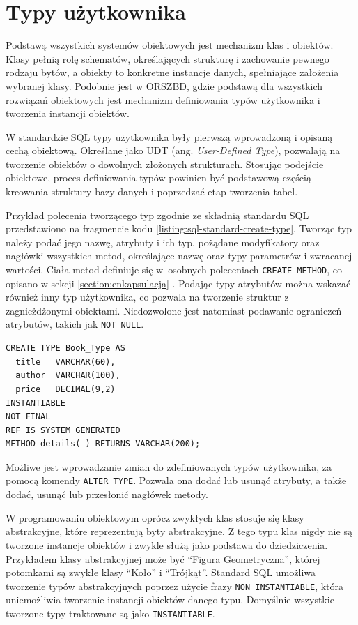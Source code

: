 \documentclass[a4paper,twoside,12pt]{book}
\begin{document}
\section{Typy użytkownika}

Podstawą wszystkich systemów obiektowych jest mechanizm klas i obiektów. Klasy pełnią rolę schematów, określających strukturę i zachowanie pewnego rodzaju bytów, a obiekty to konkretne instancje danych, spełniające założenia wybranej klasy. Podobnie jest w ORSZBD, gdzie podstawą dla wszystkich rozwiązań obiektowych jest mechanizm definiowania typów użytkownika i tworzenia instancji obiektów.

W standardzie SQL typy użytkownika były pierwszą wprowadzoną i opisaną cechą obiektową. Określane jako UDT (ang. \textit{User-Defined Type}), pozwalają na tworzenie obiektów o dowolnych złożonych strukturach. Stosując podejście obiektowe, proces definiowania typów powinien być podstawową częścią kreowania struktury bazy danych i poprzedzać etap tworzenia tabel.

Przykład polecenia tworzącego typ zgodnie ze składnią standardu SQL przedstawiono na fragmencie kodu \ref{listing:sql-standard-create-type}. Tworząc typ należy podać jego nazwę, atrybuty i ich typ, pożądane modyfikatory oraz nagłówki wszystkich metod, określające nazwę oraz typy parametrów i zwracanej wartości. Ciała metod definiuje się w~osobnych poleceniach \lstinline{CREATE METHOD}, co opisano w sekcji \ref{section:enkapsulacja} . Podając typy atrybutów można wskazać również inny typ użytkownika, co pozwala na tworzenie struktur z zagnieżdżonymi obiektami. Niedozwolone jest natomiast podawanie ograniczeń atrybutów, takich jak \lstinline{NOT NULL}.

\begin{lstlisting}[style=SQL, caption={Tworzenie typu użytkownika według standardu SQL.}, label={listing:sql-standard-create-type}, captionpos=b]
CREATE TYPE Book_Type AS              
  title   VARCHAR(60),                  
  author  VARCHAR(100),             
  price   DECIMAL(9,2)     
INSTANTIABLE    
NOT FINAL
REF IS SYSTEM GENERATED
METHOD details( ) RETURNS VARCHAR(200);
\end{lstlisting}

Możliwe jest wprowadzanie zmian do zdefiniowanych typów użytkownika, za pomocą komendy \lstinline{ALTER TYPE}. Pozwala ona dodać lub usunąć atrybuty, a także dodać, usunąć lub przesłonić nagłówek metody.

W programowaniu obiektowym oprócz zwykłych klas stosuje się klasy abstrakcyjne, które reprezentują byty abstrakcyjne. Z tego typu klas nigdy nie są tworzone instancje obiektów i zwykle służą jako podstawa do dziedziczenia. Przykładem klasy abstrakcyjnej może być ``Figura Geometryczna'', której potomkami są zwykłe klasy ``Koło'' i ``Trójkąt''. Standard SQL umożliwa tworzenie typów abstrakcyjnych poprzez użycie frazy \lstinline{NON INSTANTIABLE}, która uniemożliwia tworzenie instancji obiektów danego typu. Domyślnie wszystkie tworzone typy traktowane są jako \lstinline{INSTANTIABLE}.
\end{document}
